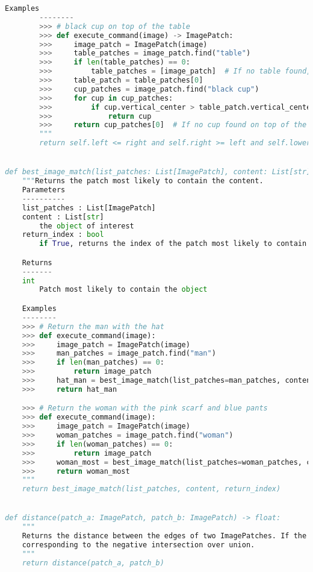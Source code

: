 \documentclass[10pt,twocolumn,letterpaper]{article}
\begin{document}
\begin{lstlisting}[language=Python, xleftmargin=.0\textwidth, xrightmargin=.0\textwidth, caption=\textbf{Full API.}, label={listing}]
        Examples
        --------
        >>> # black cup on top of the table
        >>> def execute_command(image) -> ImagePatch:
        >>>     image_patch = ImagePatch(image)
        >>>     table_patches = image_patch.find("table")
        >>>     if len(table_patches) == 0:
        >>>         table_patches = [image_patch]  # If no table found, assume the whole image is a table
        >>>     table_patch = table_patches[0]
        >>>     cup_patches = image_patch.find("black cup")
        >>>     for cup in cup_patches:
        >>>         if cup.vertical_center > table_patch.vertical_center
        >>>             return cup
        >>>     return cup_patches[0]  # If no cup found on top of the table, return the first cup found
        """
        return self.left <= right and self.right >= left and self.lower <= upper and self.upper >= lower


def best_image_match(list_patches: List[ImagePatch], content: List[str], return_index=False) -> Union[ImagePatch, int]:
    """Returns the patch most likely to contain the content.
    Parameters
    ----------
    list_patches : List[ImagePatch]
    content : List[str]
        the object of interest
    return_index : bool
        if True, returns the index of the patch most likely to contain the object

    Returns
    -------
    int
        Patch most likely to contain the object

    Examples
    --------
    >>> # Return the man with the hat
    >>> def execute_command(image):
    >>>     image_patch = ImagePatch(image)
    >>>     man_patches = image_patch.find("man")
    >>>     if len(man_patches) == 0:
    >>>         return image_patch
    >>>     hat_man = best_image_match(list_patches=man_patches, content=["hat"])
    >>>     return hat_man

    >>> # Return the woman with the pink scarf and blue pants
    >>> def execute_command(image):
    >>>     image_patch = ImagePatch(image)
    >>>     woman_patches = image_patch.find("woman")
    >>>     if len(woman_patches) == 0:
    >>>         return image_patch
    >>>     woman_most = best_image_match(list_patches=woman_patches, content=["pink scarf", "blue pants"])
    >>>     return woman_most
    """
    return best_image_match(list_patches, content, return_index)


def distance(patch_a: ImagePatch, patch_b: ImagePatch) -> float:
    """
    Returns the distance between the edges of two ImagePatches. If the patches overlap, it returns a negative distance
    corresponding to the negative intersection over union.
    """
    return distance(patch_a, patch_b)



\end{lstlisting}
\end{document}
